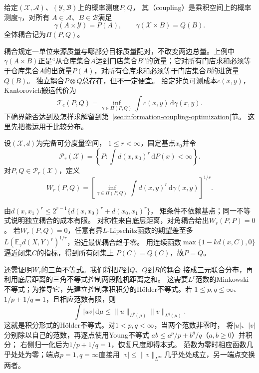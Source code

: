 \begin{definition}[耦合]
\label{def:information-coupling}
给定\((\mathcal X,\mathcal A)\)、\((\mathcal Y,\mathcal B)\)上的概率测度\(P,Q\)，
其（coupling）是乘积空间上的概率测度\(\gamma\)，对所有
\(A\in\mathcal A\)、\(B\in\mathcal B\)满足
\[
  \gamma(A\times\mathcal Y)=P(A),\qquad
  \gamma(\mathcal X\times B)=Q(B).
\]
全体耦合记为\(\Pi(P,Q)\)。
\end{definition}
耦合规定一单位来源质量与哪部分目标质量配对，不改变两边总量。上例中\(\gamma(A\times B)\)正是“从仓库集合\(A\)运到门店集合\(B\)”的货量；它对所有门店求和必须等于仓库集合\(A\)的出货量\(P(A)\)，对所有仓库求和必须等于门店集合\(B\)的进货量\(Q(B)\)。
独立耦合\(P\otimes Q\)总存在，但不一定便宜。
给定非负可测成本\(c(x,y)\)，Kantorovich搬运代价为
\begin{equation}
  \mathcal T_c(P,Q)=\inf_{\gamma\in\Pi(P,Q)}
                      \int c(x,y)\,\mathrm d\gamma(x,y).
  \label{eq:information-kantorovich-transport}
\end{equation}
下确界能否达到及怎样求解留到第~\ref{sec:information-coupling-optimization}节。
这里先把搬运用于比较分布。

\begin{definition}[Wasserstein距离]
\label{def:information-wasserstein-distance}
设\((\mathcal X,d)\)为完备可分度量空间，
\(1\leq r<\infty\)，固定基点\(x_0\)并令
\[
  \mathcal P_r(\mathcal X)=
   \left\{P:\int d(x,x_0)^r\,\mathrm dP(x)<\infty\right\}.
\]
对\(P,Q\in\mathcal P_r(\mathcal X)\)，定义
\begin{equation}
  W_r(P,Q)=\left[
    \inf_{\gamma\in\Pi(P,Q)}\int d(x,y)^r\,\mathrm d\gamma(x,y)
  \right]^{1/r}.
  \label{eq:information-wasserstein-distance}
\end{equation}
\end{definition}

由\(d(x,x_1)^r\leq2^{r-1}\{d(x,x_0)^r+d(x_0,x_1)^r\}\)，
矩条件不依赖基点；同一不等式说明独立耦合的成本有限。
对称性来自底层距离，对角耦合给出\(W_r(P,P)=0\)。
若\(W_r(P,Q)=0\)，任意有界\(L\)-Lipschitz函数的期望差至多
\(L(\mathbb E_\gamma d(X,Y)^r)^{1/r}\)，沿近最优耦合趋于零。
用连续函数\(\max\{1-kd(x,C),0\}\)逼近闭集\(C\)的指标，得到所有闭集上
\(P(C)=Q(C)\)，故\(P=Q\)。

还需证明\(W_r\)的三角不等式。我们将把\(P\)到\(Q\)、\(Q\)到\(R\)的耦合
接成三元联合分布，再利用底层距离的三角不等式控制两段随机距离之和。
这需要\(L^r\)范数的Minkowski不等式；为推导它，先建立控制乘积积分的Hölder不等式。若
\(1\leq p,q\leq\infty\)、\(1/p+1/q=1\)，且相应范数有限，则
\begin{equation}
 \int|uv|\,\mathrm d\mu\leq
 \|u\|_{L^p(\mu)}\|v\|_{L^q(\mu)}.
 \label{eq:information-integral-holder}
\end{equation}
这就是积分形式的Hölder不等式。对\(1<p,q<\infty\)，当两个范数非零时，
将\(|u|\)、\(|v|\)分别除以自己的范数，再逐点使用Young不等式
\(ab\leq a^p/p+b^q/q\)（\(a,b\geq0\)）并积分；
右侧归一化后为\(1/p+1/q=1\)，恢复尺度即得本式。
范数为零时相应函数几乎处处为零；端点\(p=1,q=\infty\)直接用
\(|v|\leq\|v\|_{L^\infty}\)几乎处处成立，另一端点交换两者。

